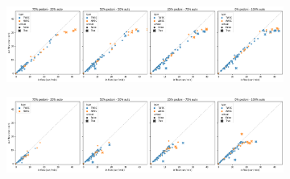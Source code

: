 \begin{figure}
    \centering
    \begin{subfigure}{0.99\textwidth}
        \centering
        \includegraphics[width=\textwidth]{images/analisi/comparison-base-in-out-flow-car.png}
        \caption{}
    \end{subfigure}
    \begin{subfigure}{0.99\textwidth}
        \centering
        \includegraphics[width=\textwidth]{images/analisi/comparison-new-in-out-flow-car.png}
        \caption{}
    \end{subfigure}
    \caption{}
    \label{fig:analisi-comparison-in-out-flow-car}
\end{figure}

